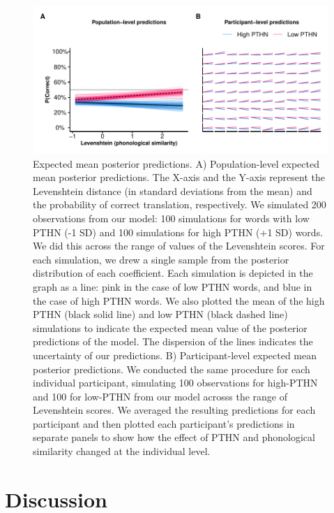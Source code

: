 \documentclass[
  english,
  man,floatsintext]{apa6}
\begin{document}
\begin{figure}
\centering
\includegraphics{manuscript_files/figure-latex/marginaleffects-1.pdf}
\caption{\label{fig:marginaleffects}Expected mean posterior predictions. A) Population-level expected mean posterior predictions. The X-axis and the Y-axis represent the Levenshtein distance (in standard deviations from the mean) and the probability of correct translation, respectively. We simulated 200 observations from our model: 100 simulations for words with low PTHN (-1 SD) and 100 simulations for high PTHN (+1 SD) words. We did this across the range of values of the Levenshtein scores. For each simulation, we drew a single sample from the posterior distribution of each coefficient. Each simulation is depicted in the graph as a line: pink in the case of low PTHN words, and blue in the case of high PTHN words. We also plotted the mean of the high PTHN (black solid line) and low PTHN (black dashed line) simulations to indicate the expected mean value of the posterior predictions of the model. The dispersion of the lines indicates the uncertainty of our predictions. B) Participant-level expected mean posterior predictions. We conducted the same procedure for each individual participant, simulating 100 observations for high-PTHN and 100 for low-PTHN from our model acrosss the range of Levenshtein scores. We averaged the resulting predictions for each participant and then plotted each participant's predictions in separate panels to show how the effect of PTHN and phonological similarity changed at the individual level.}
\end{figure}

\hypertarget{discussion}{%
\section{Discussion}\label{discussion}}

\newpage
\end{document}
